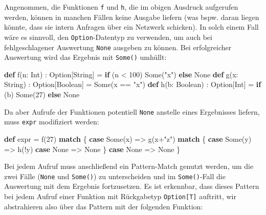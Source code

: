 \documentclass[]{article}
\newenvironment{Shaded}{}{}
\newcommand{\DecValTok}[1]{\textcolor[rgb]{0.25,0.63,0.44}{#1}}
\newcommand{\FunctionTok}[1]{\textcolor[rgb]{0.02,0.16,0.49}{#1}}
\newcommand{\KeywordTok}[1]{\textcolor[rgb]{0.00,0.44,0.13}{\textbf{#1}}}
\newcommand{\NormalTok}[1]{#1}
\newcommand{\StringTok}[1]{\textcolor[rgb]{0.25,0.44,0.63}{#1}}
\begin{document}
Angenommen, die Funktionen \texttt{f} und \texttt{h}, die im obigen
Ausdruck aufgerufen werden, können in manchen Fällen keine Ausgabe
liefern (was bspw. daran liegen könnte, dass sie intern Anfragen über
ein Netzwerk schicken). In solch einem Fall wäre es sinnvoll, den
\texttt{Option}-Datentyp zu verwenden, um auch bei fehlgeschlagener
Auswertung \texttt{None} ausgeben zu können. Bei erfolgreicher
Auswertung wird das Ergebnis mit \texttt{Some()} umhüllt:

\begin{Shaded}
\begin{Highlighting}[]
\KeywordTok{def} \FunctionTok{f}\NormalTok{(n: Int) : Option[String] = }\KeywordTok{if}\NormalTok{ (n \textless{} }\DecValTok{100}\NormalTok{) Some(}\StringTok{"x"}\NormalTok{) }\KeywordTok{else}\NormalTok{ None}
\KeywordTok{def} \FunctionTok{g}\NormalTok{(x: String) : Option[Boolean] = Some(x == }\StringTok{"x"}\NormalTok{)}
\KeywordTok{def} \FunctionTok{h}\NormalTok{(b: Boolean) : Option[Int] = }\KeywordTok{if}\NormalTok{ (b) Some(}\DecValTok{27}\NormalTok{) }\KeywordTok{else}\NormalTok{ None}
\end{Highlighting}
\end{Shaded}

Da aber Aufrufe der Funktionen potentiell \texttt{None} anstelle eines
Ergebnisses liefern, muss \texttt{expr} modifiziert werden:

\begin{Shaded}
\begin{Highlighting}[]
\KeywordTok{def}\NormalTok{ expr = }\FunctionTok{f}\NormalTok{(}\DecValTok{27}\NormalTok{) }\KeywordTok{match}\NormalTok{ \{}
  \KeywordTok{case}\NormalTok{ Some(x) =\textgreater{} }\FunctionTok{g}\NormalTok{(x+}\StringTok{"z"}\NormalTok{) }\KeywordTok{match}\NormalTok{ \{}
    \KeywordTok{case}\NormalTok{ Some(y) =\textgreater{} }\FunctionTok{h}\NormalTok{(!y)}
        \KeywordTok{case}\NormalTok{ None =\textgreater{} None}
\NormalTok{  \}}
    \KeywordTok{case}\NormalTok{ None =\textgreater{} None}
\NormalTok{\}}
\end{Highlighting}
\end{Shaded}

Bei jedem Aufruf muss anschließend ein Pattern-Match genutzt werden, um
die zwei Fälle (\texttt{None} und \texttt{Some()}) zu unterscheiden und
im \texttt{Some()}-Fall die Auswertung mit dem Ergebnis fortzusetzen. Es
ist erkennbar, dass dieses Pattern bei jedem Aufruf einer Funktion mit
Rückgabetyp \texttt{Option{[}T{]}} auftritt, wir abstrahieren also über
das Pattern mit der folgenden Funktion:
\end{document}
